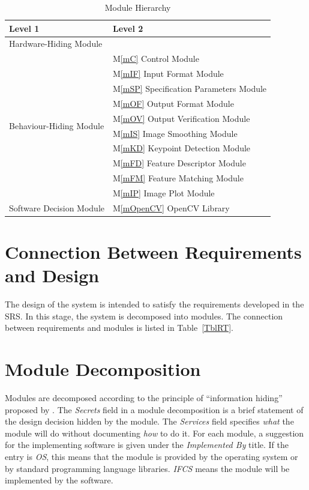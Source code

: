 \documentclass[12pt, titlepage]{article}
\newcommand{\mref}[1]{M\ref{#1}}
\begin{document}
\begin{table}[h!]
\centering
\begin{tabular}{p{} p{}}
\toprule
\textbf{Level 1} & \textbf{Level 2}\\
\midrule

{Hardware-Hiding Module} & ~ \\
\midrule

\multirow{10}{0.3\textwidth}{Behaviour-Hiding Module} & \mref{mC} Control Module\\ 
& \mref{mIF} Input Format Module\\
& \mref{mSP} Specification Parameters Module\\
& \mref{mOF} Output Format Module\\
& \mref{mOV} Output Verification Module\\
& \mref{mIS} Image Smoothing Module\\
& \mref{mKD} Keypoint Detection Module\\ 
& \mref{mFD} Feature Descriptor Module\\
& \mref{mFM} Feature Matching Module\\
& \mref{mIP} Image Plot Module\\
\midrule

\multirow{1}{0.3\textwidth}{Software Decision Module} & \mref{mOpenCV} OpenCV Library\\

\bottomrule

\end{tabular}
\caption{Module Hierarchy}
\label{TblMH}
\end{table}

\section{Connection Between Requirements and Design} \label{SecConnection}

The design of the system is intended to satisfy the requirements developed in
the SRS. In this stage, the system is decomposed into modules. The connection
between requirements and modules is listed in Table~\ref{TblRT}.

\section{Module Decomposition} \label{SecMD}

Modules are decomposed according to the principle of ``information hiding''
proposed by \citet{ParnasEtAl1984}. The \emph{Secrets} field in a module
decomposition is a brief statement of the design decision hidden by the
module. The \emph{Services} field specifies \emph{what} the module will do
without documenting \emph{how} to do it. For each module, a suggestion for the
implementing software is given under the \emph{Implemented By} title. If the
entry is \emph{OS}, this means that the module is provided by the operating
system or by standard programming language libraries.  \emph{IFCS} means the
module will be implemented by the \progname{} software.
\end{document}
